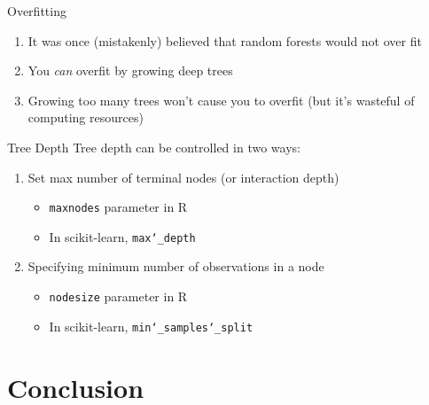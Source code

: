 \documentclass[pdf]{beamer}
\begin{document}
		\begin{frame}{Overfitting}
			\begin{enumerate}
				\item It was once (mistakenly) believed that random forests would not over fit
				\item You \textit{can} overfit by growing deep trees
				\item Growing too many trees won't cause you to overfit (but it's wasteful of computing resources)
			\end{enumerate}
		\end{frame}
		
		\begin{frame}{Tree Depth}
			Tree depth can be controlled in two ways:
			\vspace{5 mm}
			\begin{enumerate}
				\item{Set max number of terminal nodes (or interaction depth)}
					\begin{itemize}
						\item{\texttt{maxnodes} parameter in R}
						\item In scikit-learn, \texttt{max\char`_depth} 
					\end{itemize}
				
				\item{Specifying minimum number of observations in a node}
					\begin{itemize}
						\item{\texttt{nodesize} parameter in R}
						\item{In scikit-learn,  \texttt{min\char`_samples\char`_split}}
					\end{itemize}
			\end{enumerate}
		\end{frame}
	
	
		
\section{Conclusion}	
	
\end{document}
